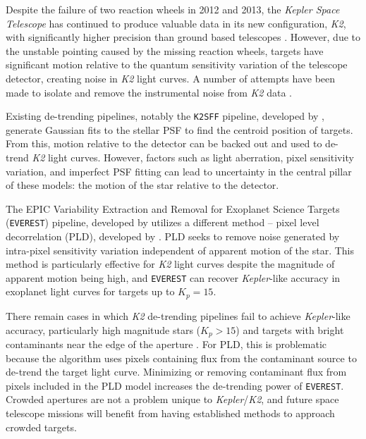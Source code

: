 \documentclass[12pt,preprint]{aastex}
\begin{document}
Despite the failure of two reaction wheels in 2012 and 2013, the \textit{Kepler Space Telescope} has continued to produce valuable data in its new configuration, \textit{K2}, with significantly higher precision than ground based telescopes \citep{2014PASP..126..398H}. However, due to the unstable pointing caused by the missing reaction wheels, targets have significant motion relative to the quantum sensitivity variation of the telescope detector, creating noise in \textit{K2} light curves. A number of attempts have been made to isolate and remove the instrumental noise from \textit{K2} data \citep{2015A&A...579A..19A, 0004-637X-806-1-30, 2015MNRAS.454.4159H, 2015MNRAS.447.2880A, 2016MNRAS.459.2408A}.

Existing de-trending pipelines, notably the \texttt{K2SFF} pipeline, developed by \cite{2014PASP..126..948V}, generate Gaussian fits to the stellar PSF to find the centroid position of targets. From this, motion relative to the detector can be backed out and used to de-trend \textit{K2} light curves. However, factors such as light aberration, pixel sensitivity variation, and imperfect PSF fitting can lead to uncertainty in the central pillar of these models: the motion of the star relative to the detector.

The EPIC Variability Extraction and Removal for Exoplanet Science Targets (\texttt{EVEREST}) pipeline, developed by \cite{2016AJ....152..100L, 2017arXiv170205488L} utilizes a different method -- pixel level decorrelation (PLD), developed by \cite{0004-637X-805-2-132}. PLD seeks to remove noise generated by intra-pixel sensitivity variation independent of apparent motion of the star. This method is particularly effective for \textit{K2} light curves despite the magnitude of apparent motion being high, and \texttt{EVEREST} can recover \textit{Kepler}-like accuracy in exoplanet light curves for targets up to $K_p = 15$.

There remain cases in which \textit{K2} de-trending pipelines fail to achieve \textit{Kepler}-like accuracy, particularly high magnitude stars ($K_p > 15$) and targets with bright contaminants near the edge of the aperture \citep{2017arXiv170205488L}. For PLD, this is problematic because the algorithm uses pixels containing flux from the contaminant source to de-trend the target light curve. Minimizing or removing contaminant flux from pixels included in the PLD model increases the de-trending power of \texttt{EVEREST}. Crowded apertures are not a problem unique to \textit{Kepler}/\textit{K2}, and future space telescope missions will benefit from having established methods to approach crowded targets.
\end{document}
